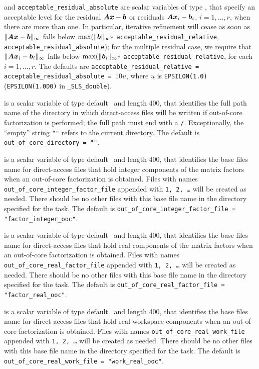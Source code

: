 \documentclass{galahad}
\newcommand{\packagename}{SLS}
\newcommand{\fullpackagename}{\libraryname\_\-\packagename}
\begin{document}
\begin{description}
  and {\tt acceptable\_residual\_absolute}
are scalar variables of type \realdp, that
specify an acceptable level for the residual ${\bm{A}} {\bm{x}} - {\bm{b}}$ or residuals
${\bm{A}} {\bm{x}}_i - {\bm{b}}_i$, $i=1,\ldots,r$,  when there are more than one.
In particular, iterative refinement will cease as soon as
$\|{\bm{A}} {\bm{x}} - {\bm{b}}\|_{\infty}$ falls below
$\max (\| {\bm{b}}\|_{\infty} \ast$ {\tt acceptable\_residual\_relative},
{\tt acceptable\_residual\_absolute}$)$;
for the multiple residual case, we require that
$\|{\bm{A}} {\bm{x}}_i - {\bm{b}}_i\|_{\infty}$ falls below
$\max (\| {\bm{b}}_i\|_{\infty} \ast$ {\tt acceptable\_residual\_relative},
for each $i=1,\ldots,r$.
The defaults are {\tt acceptable\_residual\_relative =
acceptable\_resi\-dual\_absolute = }$10 u$,
where $u$ is {\tt EPSILON(1.0)} ({\tt EPSILON(1.0D0)} in
{\tt \fullpackagename\_double}).

is a scalar variable of type default \character\
and length 400, that identifies the full path name of the
directory in which direct-access files will be written if out-of-core
factorization is performed; the full path must end with a {\tt /}.
Exceptionally, the ``empty'' string {\tt ""} refers to the current
directory. The default is {\tt out\_of\_core\_directory = ""}.

is a scalar variable of type default \character\
and length 400, that identifies the base files name for direct-access files that
hold integer components of the matrix factors when an
out-of-core factorization is obtained.
Files with names
{\tt out\_of\_core\_integer\_factor\_file}
appended with {\tt 1, 2, \ldots} will be created as needed.
There should be no other files with this base file name in the directory
specified for the task.
The default is
{\tt out\_of\_core\_integer\_factor\_file = "factor\_integer\_ooc"}.

\itt{out\_of\_core\_real\_factor\_file}
is a scalar variable of type default \character\
and length 400, that identifies the base files name for direct-access files that
hold real components of the matrix factors when an
out-of-core factorization is obtained.
Files with names
{\tt out\_of\_core\_real\_factor\_file}
appended with {\tt 1, 2, \ldots} will be created as needed.
There should be no other files with this base file name in the directory
specified for the task.
The default is
{\tt out\_of\_core\_real\_factor\_file =
"factor\_real\_ooc"}.

is a scalar variable of type default \character\
and length 400, that identifies the base files name for direct-access files that
hold real workspace components when an
out-of-core factorization is obtained.
Files with names
{\tt out\_of\_core\_real\_work\_file}
appended with {\tt 1, 2, \ldots} will be created as needed.
There should be no other files with this base file name in the directory
specified for the task.
The default is
{\tt out\_of\_core\_real\_work\_file = "work\_real\_ooc"}.


\end{description}
\end{document}
